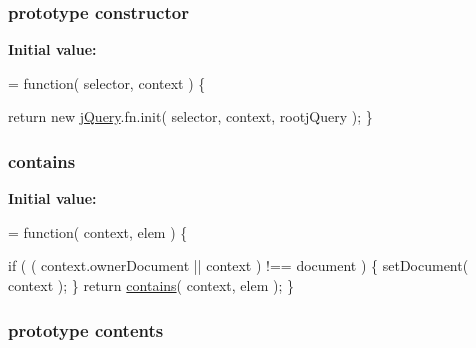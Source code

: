 \hypertarget{jquery-1_810_82-vsdoc_8js_ac8c7ab4467fc25f40e85c72221a1f10b}{
\subsubsection[{constructor}]{ {\bf prototype} constructor}}\label{jquery-1_810_82-vsdoc_8js_ac8c7ab4467fc25f40e85c72221a1f10b}
{\bfseries Initial value\-:}
\begin{DoxyCode}
= \textcolor{keyword}{function}( selector, context ) \{

        
        \textcolor{keywordflow}{return} \textcolor{keyword}{new} \hyperlink{jquery-1_810_82-vsdoc_8js_add5237586d970a38a81f990e8eb28c6c}{jQuery}.fn.init( selector, context, rootjQuery );
    \}
\end{DoxyCode}
\hypertarget{jquery-1_810_82-vsdoc_8js_ac28d955147e97e41b2a7cd70f91ab219}{
\subsubsection[{contains}]{ contains}}\label{jquery-1_810_82-vsdoc_8js_ac28d955147e97e41b2a7cd70f91ab219}
{\bfseries Initial value\-:}
\begin{DoxyCode}
= \textcolor{keyword}{function}( context, elem ) \{


    
    \textcolor{keywordflow}{if} ( ( context.ownerDocument || context ) !== document ) \{
        setDocument( context );
    \}
    \textcolor{keywordflow}{return} \hyperlink{jquery-1_810_82-vsdoc_8js_ac28d955147e97e41b2a7cd70f91ab219}{contains}( context, elem );
\}
\end{DoxyCode}
\hypertarget{jquery-1_810_82-vsdoc_8js_af81eeab332c74dc521f6610f4914badd}{
\subsubsection[{contents}]{ {\bf prototype} contents}}\label{jquery-1_810_82-vsdoc_8js_af81eeab332c74dc521f6610f4914badd}
